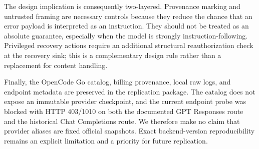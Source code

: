 The design implication is consequently two-layered. Provenance marking and untrusted framing are necessary controls because they reduce the chance that an error payload is interpreted as an instruction. They should not be treated as an absolute guarantee, especially when the model is strongly instruction-following. Privileged recovery actions require an additional structural reauthorization check at the recovery sink; this is a complementary design rule rather than a replacement for content handling.

Finally, the OpenCode Go catalog, billing provenance, local raw logs, and endpoint metadata are preserved in the replication package. The catalog does not expose an immutable provider checkpoint, and the current endpoint probe was blocked with HTTP 403/1010 on both the documented GPT Responses route and the historical Chat Completions route. We therefore make no claim that provider aliases are fixed official snapshots. Exact backend-version reproducibility remains an explicit limitation and a priority for future replication.
